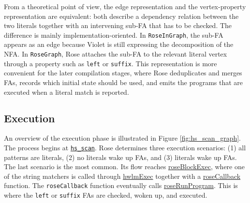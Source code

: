 From a theoretical point of view, the edge representation and the vertex-property representation are equivalent: both describe a dependency relation between the two literals together with an intervening sub-FA that has to be checked. The difference is mainly implementation-oriented. In \texttt{RoseInGraph}, the sub-FA appears as an edge because Violet is still expressing the decomposition of the NFA. In \texttt{RoseGraph}, Rose attaches the sub-FA to the relevant literal vertex through a property such as \texttt{left} or \texttt{suffix}. This representation is more convenient for the later compilation stages, where Rose deduplicates and merges FAs, records which initial state should be used, and emits the programs that are executed when a literal match is reported.

\subsection{Execution}

An overview of the execution phase is illustrated in Figure \ref{fig:hs_scan_graph}. The process begins at \href{https://github.com/intel/hyperscan/blob/474d36044c50f0f8bdd51698cdec3329da79de9e/src/hs_runtime.h#L479}{\texttt{hs\_scan}}. Rose determines three execution scenarios: (1) all patterns are literals, (2) no literals wake up FAs, and (3) literals wake up FAs. The last scenario is the most common. Its flow reaches \href{https://github.com/intel/hyperscan/blob/474d36044c50f0f8bdd51698cdec3329da79de9e/src/rose/rose.h#L41}{roseBlockExec}, where one of the string matchers is called through \href{https://github.com/intel/hyperscan/blob/474d36044c50f0f8bdd51698cdec3329da79de9e/src/hwlm/hwlm.h#L116}{hwlmExec} together with a \href{https://github.com/intel/hyperscan/blob/474d36044c50f0f8bdd51698cdec3329da79de9e/src/rose/rose.h#L49}{roseCallback} function. The \texttt{roseCallback} function eventually calls \href{https://github.com/intel/hyperscan/blob/474d36044c50f0f8bdd51698cdec3329da79de9e/src/rose/program_runtime.h#L53}{roseRunProgram}. This is where the \texttt{left} or \texttt{suffix} FAs are checked, woken up, and executed.

